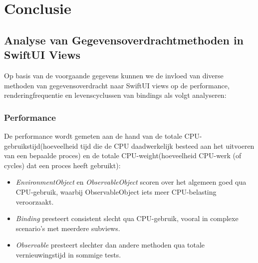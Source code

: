 
\chapter{Conclusie}%
\label{ch:conclusie}



\section{Analyse van Gegevensoverdrachtmethoden in SwiftUI Views}
Op basis van de voorgaande gegevens kunnen we de invloed van diverse methoden van gegevensoverdracht naar SwiftUI views op de performance, renderingfrequentie en levenscyclussen van bindings als volgt analyseren:

\subsection{Performance}
De performance wordt gemeten aan de hand van de totale CPU-gebruikstijd(hoeveelheid tijd die de CPU daadwerkelijk besteed aan het uitvoeren van een bepaalde proces) en de totale CPU-weight(hoeveelheid CPU-werk (of cycles) dat een proces heeft gebruikt):
\begin{itemize}
    \item \textit{EnvironmentObject} en \textit{ObservableObject} scoren over het algemeen goed qua CPU-gebruik, waarbij ObservableObject iets meer CPU-belasting veroorzaakt.
    \item \textit{Binding} presteert consistent slecht qua CPU-gebruik, vooral in complexe scenario's met meerdere subviews.
    \item \textit{Observable} presteert slechter dan andere methoden qua totale vernieuwingstijd in sommige tests.
\end{itemize}


